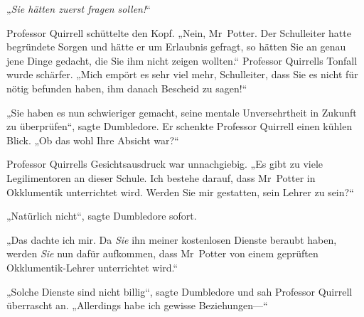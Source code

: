 „\emph{Sie hätten zuerst fragen sollen!}“

Professor Quirrell schüttelte den Kopf. „Nein, Mr~Potter. Der Schulleiter hatte begründete Sorgen und hätte er um Erlaubnis gefragt, so hätten Sie an genau jene Dinge gedacht, die Sie ihm nicht zeigen wollten.“ Professor Quirrells Tonfall wurde schärfer. „Mich empört es sehr viel mehr, Schulleiter, dass Sie es nicht für nötig befunden haben, ihm danach Bescheid zu sagen!“

„Sie haben es nun schwieriger gemacht, seine mentale Unversehrtheit in Zukunft zu überprüfen“, sagte Dumbledore. Er schenkte Professor Quirrell einen kühlen Blick. „Ob das wohl Ihre Absicht war?“

Professor Quirrells Gesichtsausdruck war unnachgiebig. „Es gibt zu viele Legilimentoren an dieser Schule. Ich bestehe darauf, dass Mr~Potter in Okklumentik unterrichtet wird. Werden Sie mir gestatten, sein Lehrer zu sein?“

„Natürlich nicht“, sagte Dumbledore sofort.

„Das dachte ich mir. Da \emph{Sie} ihn meiner kostenlosen Dienste beraubt haben, werden \emph{Sie} nun dafür aufkommen, dass Mr~Potter von einem geprüften Okklumentik-Lehrer unterrichtet wird.“

„Solche Dienste sind nicht billig“, sagte Dumbledore und sah Professor Quirrell überrascht an. „Allerdings habe ich gewisse Beziehungen—“

